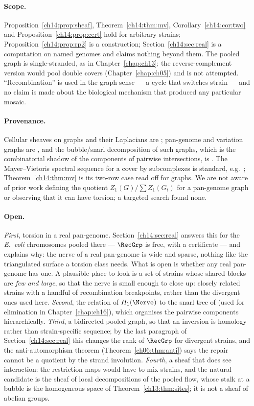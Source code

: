 \paragraph{Scope.} Proposition~\ref{ch14:prop:sheaf}, Theorem~\ref{ch14:thm:mv},
Corollary~\ref{ch14:cor:two} and Proposition~\ref{ch14:prop:cert} hold for arbitrary strains;
Proposition~\ref{ch14:prop:rp2} is a construction; Section~\ref{ch14:sec:real} is a computation on
named genomes and claims nothing beyond them.
The pooled graph is single-stranded, as in Chapter~\ref{chap:ch13}; the reverse-complement
version would pool double covers (Chapter~\ref{chap:ch05}) and is not attempted. ``Recombination'' is used in the graph sense
--- a cycle that switches strain --- and no claim is made about the biological mechanism that
produced any particular mosaic.

\paragraph{Provenance.} Cellular sheaves on graphs and their Laplacians are \cite{HG19};
pan-genome and variation graphs are \cite{GSN18,EPN20}, and the bubble/snarl decomposition of
such graphs, which is the combinatorial shadow of the components of pairwise intersections,
is \cite{Pat18}. The Mayer--Vietoris spectral sequence for a cover by subcomplexes is
standard, e.g.\ \cite[VII.4]{Bro82}; Theorem~\ref{ch14:thm:mv} is its two-row case read off for
graphs. We are not aware of prior work defining the quotient $Z_1(G)/\sum Z_1(G_i)$ for a
pan-genome graph or observing that it can have torsion; a targeted search found none.

\paragraph{Open.} \emph{First}, torsion in a real pan-genome. Section~\ref{ch14:sec:real} answers
this for the \emph{E.\ coli} chromosomes pooled there --- $\RecGrp$ is free, with a certificate
--- and explains why: the nerve of a real pan-genome is wide and sparse, nothing like the
triangulated surface a torsion class needs. What is open is whether any real pan-genome has
one. A plausible place to look is a set of strains whose shared blocks are \emph{few and
large}, so that the nerve is small enough to close up: closely related strains with a
handful of recombination breakpoints, rather than the divergent ones used here. \emph{Second},
the relation of $H_1(\Nerve)$ to the snarl tree of \cite{Pat18} (used for elimination in
Chapter~\ref{chap:ch16}), which organises the pairwise
components hierarchically. \emph{Third}, a bidirected pooled graph, so that an inversion is
homology rather than strain-specific sequence; by the last paragraph of Section~\ref{ch14:sec:real}
this changes the rank of $\RecGrp$ for divergent strains, and the anti-automorphism theorem (Theorem~\ref{ch06:thm:anti})
says the repair cannot be a quotient by the strand involution. \emph{Fourth}, a sheaf that
does see interaction: the restriction maps would
have to mix strains, and the natural candidate is the sheaf of local decompositions of the
pooled flow, whose stalk at a bubble is the homogeneous space of Theorem~\ref{ch13:thm:sites}; it is not a
sheaf of abelian groups.
